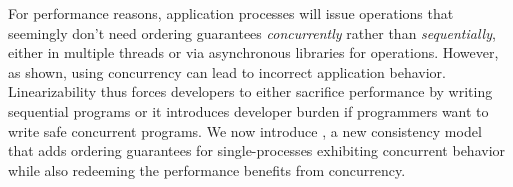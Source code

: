 For performance reasons, application processes will issue operations that seemingly don't need ordering guarantees \textit{concurrently} rather than \textit{sequentially}, either in multiple threads or via asynchronous libraries for operations. However, as shown, using concurrency can lead to incorrect application behavior. Linearizability thus forces developers to either sacrifice performance by writing sequential programs or it introduces developer burden if programmers want to write safe concurrent programs. We now introduce \mdl{}, a new consistency model that adds ordering guarantees for single-processes exhibiting concurrent behavior
while also redeeming the performance benefits from concurrency.



